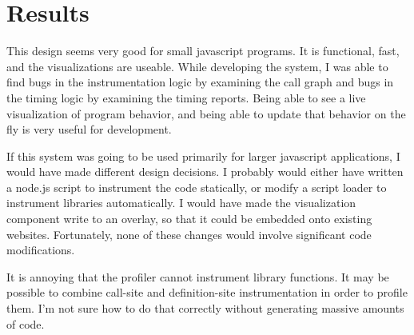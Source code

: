 \documentclass{article}
\begin{document}
\section*{Results}

This design seems very good for small javascript programs. It is functional, fast, and the visualizations are useable. While developing the system, I was able to find bugs in the instrumentation logic by examining the call graph and bugs in the timing logic by examining the timing reports. Being able to see a live visualization of program behavior, and being able to update that behavior on the fly is very useful for development.

If this system was going to be used primarily for larger javascript applications, I would have made different design decisions. I probably would either have written a node.js script to instrument the code statically, or modify a script loader to instrument libraries automatically. I would have made the visualization component write to an overlay, so that it could be embedded onto existing websites. Fortunately, none of these changes would involve significant code modifications.

It is annoying that the profiler cannot instrument library functions. It may be possible to combine call-site and definition-site instrumentation in order to profile them. I'm not sure how to do that correctly without generating massive amounts of code.

{}
\nocite{*}

\end{document}
